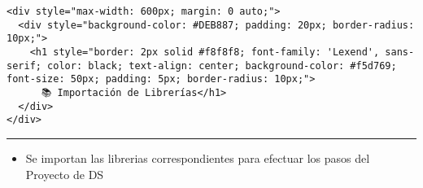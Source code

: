 \documentclass[11pt]{article}
\providecommand{\tightlist}{%
      \setlength{\itemsep}{0pt}\setlength{\parskip}{0pt}}
\begin{document}
\begin{verbatim}
<div style="max-width: 600px; margin: 0 auto;">
  <div style="background-color: #DEB887; padding: 20px; border-radius: 10px;">
    <h1 style="border: 2px solid #f8f8f8; font-family: 'Lexend', sans-serif; color: black; text-align: center; background-color: #f5d769; font-size: 50px; padding: 5px; border-radius: 10px;">
      📚 Importación de Librerías</h1>
  </div>
</div>
\end{verbatim}

\begin{center}\rule{0.5\linewidth}{0.5pt}\end{center}

    \begin{itemize}
\tightlist
\item
  Se importan las librerias correspondientes para efectuar los pasos del
  Proyecto de DS
\end{itemize}
\end{document}
